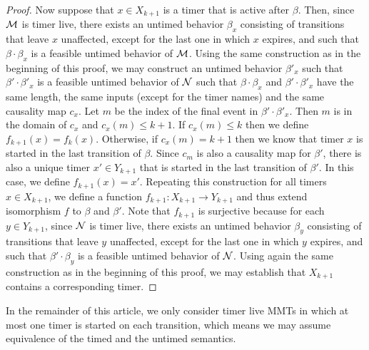\begin{proof}
Now suppose that $x \in X_{k+1}$ is a timer that is active after $\beta$.
Then, since ${\mathcal M}$ is timer live, there exists an untimed behavior $\beta_x$ consisting of transitions that leave $x$ unaffected, except for the last one in which $x$ expires, and such that $\beta \cdot \beta_x$ is a feasible untimed behavior of ${\mathcal M}$.
Using the same construction as in the beginning of this proof, we may construct an untimed behavior $\beta'_x$ such
that $\beta' \cdot \beta'_x$ is a feasible untimed behavior of ${\mathcal N}$ such that $\beta \cdot \beta_x$ and $\beta' \cdot \beta'_x$
have the same length, the same inputs (except for the timer names) and the same causality map $c_x$.
Let $m$ be the index of the final event in $\beta' \cdot \beta'_x$. Then $m$ is in the domain of $c_x$ and $c_x(m) \leq k+1$.
If $c_x(m) \leq k$ then we define $f_{k+1}(x) = f_k (x)$.
Otherwise, if $c_x(m) = k+1$ then we know that timer $x$ is started in the last transition of $\beta$.
Since $c_m$ is also a causality map for $\beta'$, there is also a unique timer $x' \in Y_{k+1}$ that is started in the last transition of $\beta'$.
In this case, we define $f_{k+1}(x) = x'$.
Repeating this construction for all timers $x \in X_{k+1}$, we define a function $f_{k+1} : X_{k+1} \rightarrow Y_{k+1}$ and thus
extend isomorphism $f$ to $\beta$ and $\beta'$.
Note that $f_{k+1}$ is surjective because for each $y \in Y_{k+1}$, since ${\mathcal N}$ is timer live,
there exists an untimed behavior $\beta_y$ consisting of transitions that leave $y$ unaffected, except for the last one in which $y$ expires, and such that $\beta' \cdot \beta_y$ is a feasible untimed behavior of ${\mathcal N}$.
Using again the same construction as in the beginning of this proof, we may establish that $X_{k+1}$ contains a corresponding timer. 
\end{proof}
\fi

In the remainder of this article, we only consider timer live MMTs in which at most one timer is started on each transition,
which means we may assume equivalence of the timed and the untimed semantics.
